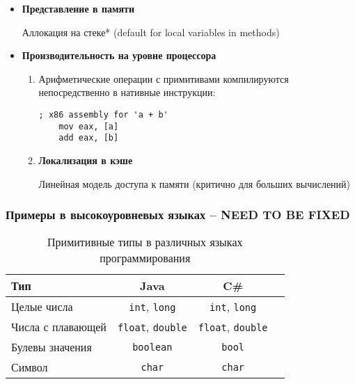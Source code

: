 \begin{itemize}
    \item \textbf{Представление в памяти}
    \begin{itemize}
        {Аллокация на стеке}* (default for local variables in methods)
    \end{itemize}
    \item \textbf{Производительность на уровне процессора}
    \begin{enumerate}
        \item

        Арифметические операции с примитивами компилируются непосредственно в нативные инструкции:

        \begin{lstlisting}[language={[x86masm]Assembler}]
    ; x86 assembly for 'a + b'
    mov eax, [a]
    add eax, [b]
        \end{lstlisting}

        \item \textbf{Локализация в кэше}

        Линейная модель доступа к памяти (критично для больших вычислений)
    \end{enumerate}
\end{itemize}

\subsubsection{Примеры в высокоуровневых языках -- NEED TO BE FIXED}

\begin{table}[h]
    \centering
    \caption{Примитивные типы в различных языках программирования}
    \begin{tabular}{lccc}
        \toprule
        \textbf{Тип} & \textbf{Java} & \textbf{C\#}  \\
        \midrule
        Целые числа & \texttt{int}, \texttt{long} & \texttt{int}, \texttt{long} \\
        Числа с плавающей & \texttt{float}, \texttt{double} & \texttt{float}, \texttt{double}  \\
        Булевы значения & \texttt{boolean} & \texttt{bool} \\
        Символ & \texttt{char} & \texttt{char} \\
        \bottomrule
    \end{tabular}
\end{table}

\newpage

